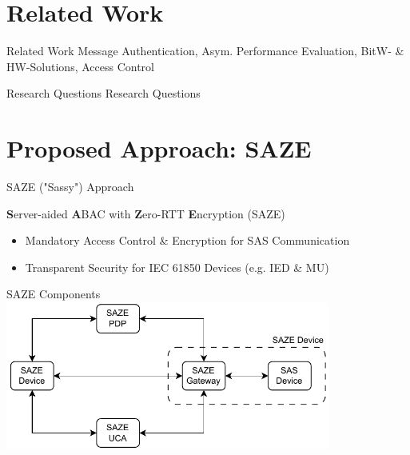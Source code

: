 \documentclass[en]{sdqbeamer}
\begin{document}
\section{Related Work}
\begin{frame}{Related Work}
    Message Authentication, Asym. Performance Evaluation, BitW- \& HW-Solutions, Access Control
\end{frame}

\begin{frame}{Research Questions}
    Research Questions
\end{frame}

\section{Proposed Approach: SAZE}
\begin{frame}{SAZE ("Sassy") Approach}
    \begin{greenblock}{\textbf{S}erver-aided \textbf{A}BAC with \textbf{Z}ero-RTT \textbf{E}ncryption (SAZE)}
        \begin{itemize}
            \item Mandatory Access Control \& Encryption for SAS Communication
            \item Transparent Security for IEC 61850 Devices (e.g. IED \& MU)
        \end{itemize}
    \end{greenblock}
\end{frame}

\begin{frame}{SAZE Components}
    \centering
	\includegraphics[width=0.8\textwidth]{./figures/saze_components.drawio.pdf}
\end{frame}
\end{document}
